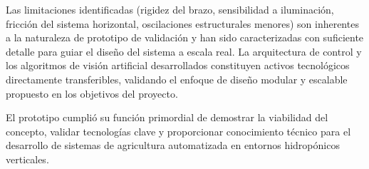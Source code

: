 




Las limitaciones identificadas (rigidez del brazo, sensibilidad a iluminación, fricción del sistema horizontal, oscilaciones estructurales menores) son inherentes a la naturaleza de prototipo de validación y han sido caracterizadas con suficiente detalle para guiar el diseño del sistema a escala real. La arquitectura de control y los algoritmos de visión artificial desarrollados constituyen activos tecnológicos directamente transferibles, validando el enfoque de diseño modular y escalable propuesto en los objetivos del proyecto.

El prototipo cumplió su función primordial de demostrar la viabilidad del concepto, validar tecnologías clave y proporcionar conocimiento técnico para el desarrollo de sistemas de agricultura automatizada en entornos hidropónicos verticales.
